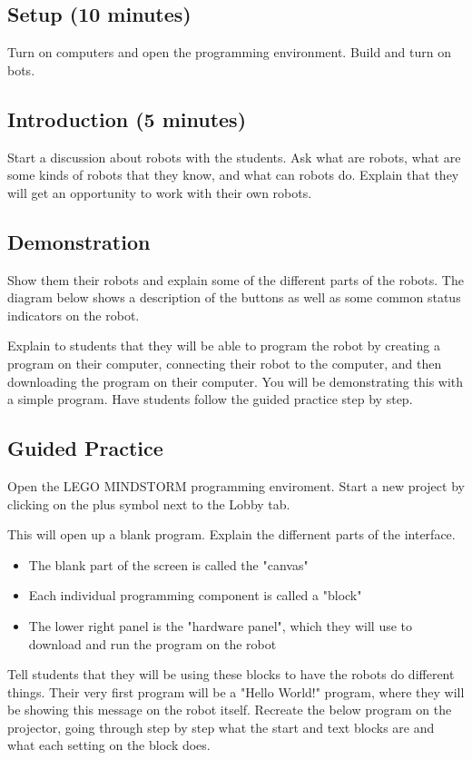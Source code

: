 \documentclass{lessonplan}
\begin{document}
    \subsection{Setup (10 minutes)}
      Turn on computers and open the programming environment. Build and turn on bots. 
    \subsection{Introduction (5 minutes)}
	Start a discussion about robots with the students. Ask what are robots, what are some kinds of robots that they know, and what can robots do. Explain that they will get an opportunity to work with their own robots. 
    \subsection{Demonstration}
      Show them their robots and explain some of the different parts of the robots. The diagram below shows a description of the buttons as well as some common status indicators on the robot. 


    Explain to students that they will be able to program the robot by creating a program on their computer, connecting their robot to the computer, and then downloading the program on their computer. You will be demonstrating this with a simple program. Have students follow the guided practice step by step. 
    \subsection{Guided Practice}
	\par Open the LEGO MINDSTORM programming enviroment. Start a new project by clicking on the plus symbol next to the Lobby tab.
	\par This will open up a blank program. Explain the differnent parts of the interface. 
	\begin{itemize}
		\item The blank part of the screen is called the "canvas"
		\item Each individual programming component is called a "block"
		\item The lower right panel is the "hardware panel", which they will use to download and run the program on the robot
	\end{itemize}

	\par Tell students that they will be using these blocks to have the robots do different things. Their very first program will be a "Hello World!" program, where they will be showing this message on the robot itself. Recreate the below program on the projector, going through step by step what the start and text blocks are and what each setting on the block does.
\end{document}
